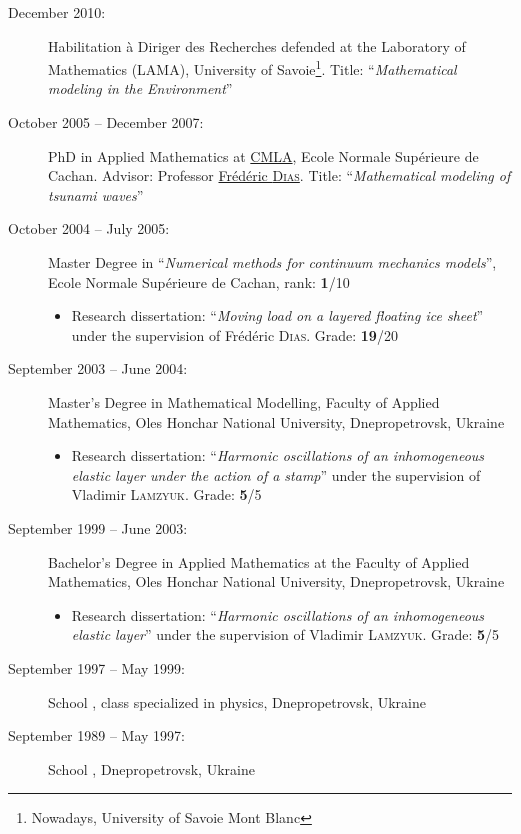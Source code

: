 \documentclass[final, a4paper, oneside, 12pt]{article}
\numberwithin{equation}{section}
\begin{document}
\begin{description}
  \item[December 2010:] Habilitation \`a Diriger des Recherches defended at the Laboratory of Mathematics (LAMA), University of Savoie\footnote{Nowadays, University of Savoie Mont Blanc}. Title: ``\textit{Mathematical modeling in the Environment}''
  
  \item[October 2005 -- December 2007:] PhD in Applied Mathematics at \href{http://www.cmla.ens-cachan.fr/}{CMLA}, Ecole Normale Sup\'erieure de Cachan. Advisor: Professor \href{http://www.cmla.ens-cachan.fr/Membres/dias}{Fr\'ed\'eric \textsc{Dias}}. Title: ``\textit{Mathematical modeling of tsunami waves}''
      
  \item[October 2004 -- July 2005:] Master Degree in ``\textit{Numerical methods for continuum mechanics models}'', Ecole Normale Sup\'erieure de Cachan, rank: \textbf{1}/10
  \begin{itemize}
     \item Research dissertation: ``\textit{Moving load on a layered floating ice sheet}'' under the supervision of Fr\'ed\'eric \textsc{Dias}. Grade: \textbf{19}/20
  \end{itemize}
      
  \item[September 2003 -- June 2004:] Master's Degree in Mathematical Modelling, Faculty of Applied Mathematics, Oles Honchar National University, Dnepropetrovsk, Ukraine
  \begin{itemize}
     \item Research dissertation: ``\textit{Harmonic oscillations of an inhomogeneous elastic layer under the action of a stamp}'' under the supervision of Vladimir \textsc{Lamzyuk}. Grade: \textbf{5}/5
  \end{itemize}
      
  \item[September 1999 -- June 2003:] Bachelor's Degree in Applied Mathematics at the Faculty of Applied Mathematics, Oles Honchar National University, Dnepropetrovsk, Ukraine
  \begin{itemize}
     \item Research dissertation: ``\textit{Harmonic oscillations of an inhomogeneous elastic layer}'' under the supervision of Vladimir \textsc{Lamzyuk}. Grade: \textbf{5}/5
  \end{itemize}
     
  \item[September 1997 -- May 1999:] School , class specialized in physics, Dnepropetrovsk, Ukraine
      
  \item[September 1989 -- May 1997:] School , Dnepropetrovsk, Ukraine
      
\end{description}
\end{document}
